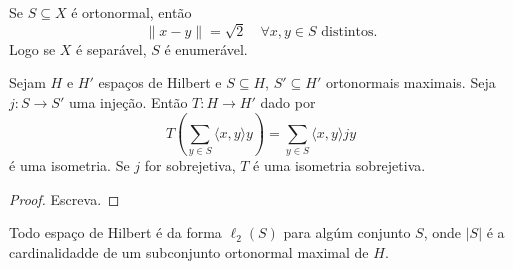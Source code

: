 \documentclass[portuguese]{article}
\theoremstyle{definition}
\begin{document}
\begin{prop}
	Se $S\subseteq X$ é ortonormal, então
	\[\|x-y\|=\sqrt{2}\quad\forall x,y\in S\text{ distintos}.\]
	Logo se $X$ é separável, $S$ é enumerável.
\end{prop}
\begin{coro}
	Sejam $H$ e $H'$ espaços de Hilbert e $S\subseteq H$, $S'\subseteq H'$ ortonormais maximais. Seja $j:S\to S'$ uma injeção. Então $T:H\to H'$ dado por
	\[T\left(\sum_{y\in S}\langle x,y\rangle y\right)=\sum_{y\in S}\langle x,y\rangle jy\]
	é uma isometria. Se $j$ for sobrejetiva, $T$ é uma isometria sobrejetiva.
\end{coro}
\begin{proof}
	Escreva.
\end{proof}
\begin{coro}
	Todo espaço de Hilbert é da forma $\ell_2(S)$ para algúm conjunto $S$, onde $|S|$ é a cardinalidadde de um subconjunto ortonormal maximal de $H$.
\end{coro}
\end{document}
